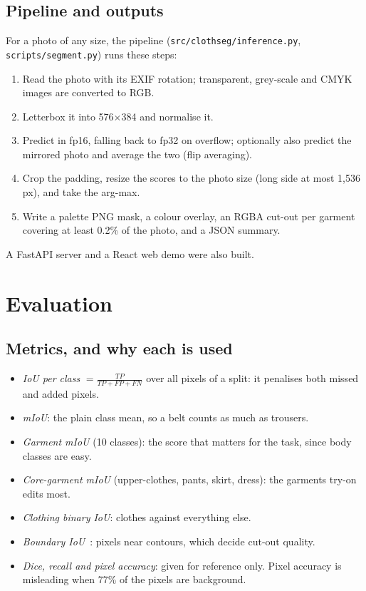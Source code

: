 \documentclass[conference,a4paper]{IEEEtran}
\begin{document}
\subsection{Pipeline and outputs}
\label{sec:pipeline}

For a photo of any size, the pipeline (\texttt{src/clothseg/inference.py}, \texttt{scripts/segment.py}) runs these steps:
\begin{enumerate}
  \item Read the photo with its EXIF rotation; transparent, grey-scale and CMYK images are converted to RGB.
  \item Letterbox it into 576$\times$384 and normalise it.
  \item Predict in fp16, falling back to fp32 on overflow; optionally also predict the mirrored photo and average the two (flip averaging).
  \item Crop the padding, resize the scores to the photo size (long side at most 1,536\,px), and take the arg-max.
  \item Write a palette PNG mask, a colour overlay, an RGBA cut-out per garment covering at least 0.2\% of the photo, and a JSON summary.
\end{enumerate}
A FastAPI server and a React web demo were also built.

\section{Evaluation}
\label{sec:evaluation}

\subsection{Metrics, and why each is used}
\label{sec:protocol}

\begin{itemize}
  \item \emph{IoU per class} $=\frac{TP}{TP+FP+FN}$ over all pixels of a split: it penalises both missed and added pixels.
  \item \emph{mIoU}: the plain class mean, so a belt counts as much as trousers.
  \item \emph{Garment mIoU} (10 classes): the score that matters for the task, since body classes are easy.
  \item \emph{Core-garment mIoU} (upper-clothes, pants, skirt, dress): the garments try-on edits most.
  \item \emph{Clothing binary IoU}: clothes against everything else.
  \item \emph{Boundary IoU}~\cite{boundaryiou}: pixels near contours, which decide cut-out quality.
  \item \emph{Dice, recall and pixel accuracy}: given for reference only. Pixel accuracy is misleading when 77\% of the pixels are background.
\end{itemize}
\end{document}
